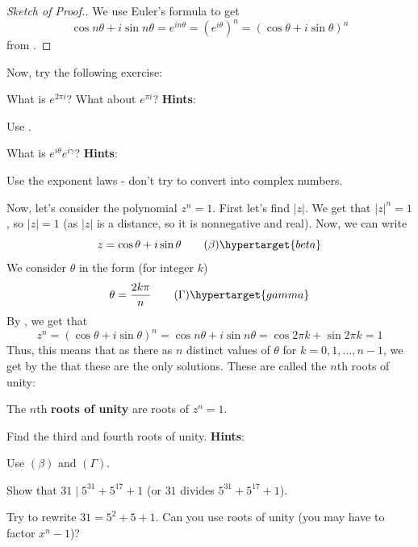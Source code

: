 \documentclass[11pt,titlepage]{scrartcl}
\newenvironment{hint}{\footnotesize \normalfont \textbf{Hints}:}{\hspace{-0.5ex}}
\begin{document}
\begin{proof}[Sketch of Proof.]
We use Euler's formula to get
\[\cos n\theta+i\sin n\theta=e^{in\theta}=\left(e^{i\theta}\right)^n=(\cos\theta+i\sin\theta)^n\]
from .
\end{proof}
Now, try the following exercise:
\begin{exercisebox}
\begin{exercise}
What is $e^{2\pi i}$? What about $e^{\pi i}$?
\begin{hint}
\begin{addhint}{
Use .
}\end{addhint}
\end{hint}
\end{exercise}
\begin{exercise}
What is $e^{i\theta}e^{i\gamma}$?
\begin{hint}
\begin{addhint}{
Use the exponent laws - don't try to convert into complex numbers.
}\end{addhint}
\end{hint}
\end{exercise}
\end{exercisebox}
Now, let's consider the polynomial $z^n=1$. First let's find $|z|$. We get that $|z|^n=1$, so $|z|=1$ (as $|z|$ is a distance, so it is nonnegative and real). Now, we can write
\[z=\cos\theta+i\sin\theta\tag{$\beta$}\hypertarget{beta}\]
We consider $\theta$ in the form (for integer $k$)
\[\theta=\dfrac{2k\pi}{n}\tag{$\Gamma$}\hypertarget{gamma}\]
By , we get that
\[z^n=(\cos\theta+i\sin\theta)^n=\cos n\theta+i\sin n\theta=\cos 2\pi k+\sin 2\pi k=1\]
Thus, this means that as there as $n$ distinct values of $\theta$ for $k=0,1,\ldots,n-1$, we get by the  that these are the only solutions. These are called the $n$th roots of unity:
\begin{defn}
The $n$th \textbf{roots of unity} are roots of $z^n=1$.
\end{defn}
\begin{exercisebox}
\begin{exercise}
Find the third and fourth roots of unity.
\begin{hint}
\begin{addhint}{
Use \hyperlink{beta}{$(\beta)$} and \hyperlink{gamma}{$(\Gamma)$}.
}\end{addhint}
\end{hint}
\end{exercise}
\begin{exercise}
Show that $31\mid 5^{31}+5^{17}+1$ (or $31$ divides $5^{31}+5^{17}+1$).
\begin{addhint}{
Try to rewrite $31=5^2+5+1$. Can you use roots of unity (you may have to factor $x^n-1$)?
}\end{addhint}
\end{exercise}
\end{exercisebox}
\end{document}
